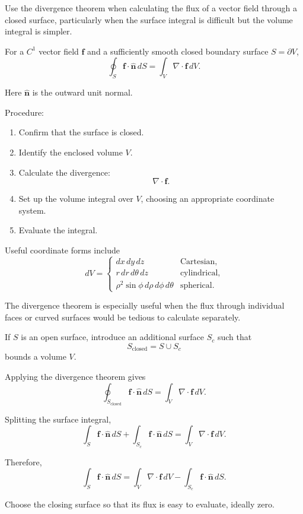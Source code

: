 \begin{method}
Use the divergence theorem when calculating the flux of a vector field through a closed surface, particularly when the surface integral is difficult but the volume integral is simpler.

For a \(C^1\) vector field \(\boldsymbol f\) and a sufficiently smooth closed boundary surface \(S=\partial V\),
\[
\boxed{
\oint_S\boldsymbol f\cdot\hat{\boldsymbol n}\,dS
=
\int_V\nabla\cdot\boldsymbol f\,dV.
}
\]

Here \(\hat{\boldsymbol n}\) is the outward unit normal.

Procedure:

\begin{enumerate}
    \item Confirm that the surface is closed.
    \item Identify the enclosed volume \(V\).
    \item Calculate the divergence:
    \[
    \nabla\cdot\boldsymbol f.
    \]
    \item Set up the volume integral over \(V\), choosing an appropriate coordinate system.
    \item Evaluate the integral.
\end{enumerate}

Useful coordinate forms include
\[
dV=
\begin{cases}
dx\,dy\,dz & \text{Cartesian},\\
r\,dr\,d\theta\,dz & \text{cylindrical},\\
\rho^2\sin\phi\,d\rho\,d\phi\,d\theta
& \text{spherical}.
\end{cases}
\]

The divergence theorem is especially useful when the flux through individual faces or curved surfaces would be tedious to calculate separately.
\end{method}

\begin{method}
If \(S\) is an open surface, introduce an additional surface \(S_c\) such that
\[
S_{\mathrm{closed}}=S\cup S_c
\]
bounds a volume \(V\).

Applying the divergence theorem gives
\[
\oint_{S_{\mathrm{closed}}}
\boldsymbol f\cdot\hat{\boldsymbol n}\,dS
=
\int_V\nabla\cdot\boldsymbol f\,dV.
\]

Splitting the surface integral,
\[
\int_S\boldsymbol f\cdot\hat{\boldsymbol n}\,dS
+
\int_{S_c}\boldsymbol f\cdot\hat{\boldsymbol n}\,dS
=
\int_V\nabla\cdot\boldsymbol f\,dV.
\]

Therefore,
\[
\boxed{
\int_S\boldsymbol f\cdot\hat{\boldsymbol n}\,dS
=
\int_V\nabla\cdot\boldsymbol f\,dV
-
\int_{S_c}\boldsymbol f\cdot\hat{\boldsymbol n}\,dS.
}
\]

Choose the closing surface so that its flux is easy to evaluate, ideally zero.
\end{method}

